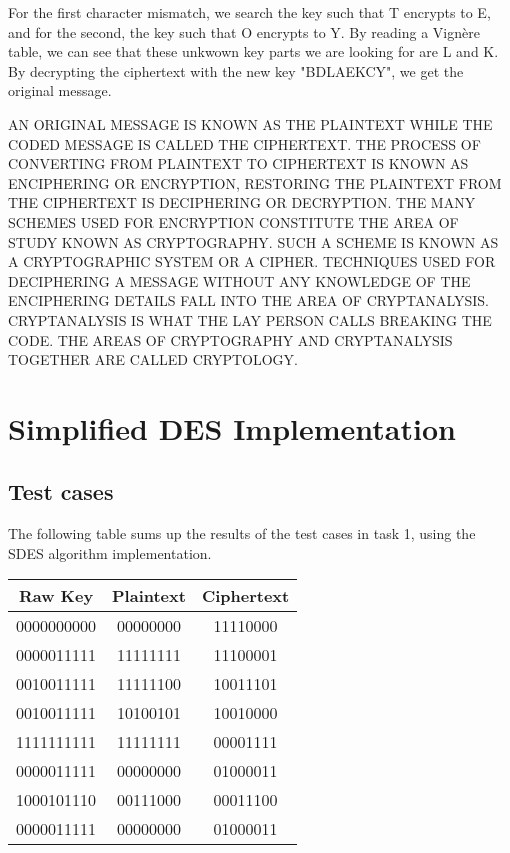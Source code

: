 \documentclass{article}
\begin{document}
For the first character mismatch, we search the key such that T encrypts to E, and for the second, the key such that O encrypts to Y. By reading a Vignère table, we can see that these unkwown key parts we are looking for are L and K.
By decrypting the ciphertext with the new key "BDLAEKCY", we get the original message.
\bigskip

\sloppy
AN ORIGINAL MESSAGE IS KNOWN AS THE PLAINTEXT WHILE THE CODED MESSAGE IS CALLED THE CIPHERTEXT. THE PROCESS OF CONVERTING FROM PLAINTEXT TO CIPHERTEXT IS KNOWN AS ENCIPHERING OR ENCRYPTION,  RESTORING THE PLAINTEXT FROM THE CIPHERTEXT IS DECIPHERING OR DECRYPTION. THE MANY SCHEMES USED FOR ENCRYPTION CONSTITUTE THE AREA OF STUDY KNOWN AS CRYPTOGRAPHY. SUCH A SCHEME IS KNOWN AS A CRYPTOGRAPHIC SYSTEM OR A CIPHER. TECHNIQUES USED FOR DECIPHERING A MESSAGE WITHOUT ANY KNOWLEDGE OF THE ENCIPHERING DETAILS FALL INTO THE AREA OF CRYPTANALYSIS. CRYPTANALYSIS IS WHAT THE LAY PERSON CALLS BREAKING THE CODE. THE AREAS OF CRYPTOGRAPHY AND CRYPTANALYSIS TOGETHER ARE CALLED CRYPTOLOGY.

\section{Simplified DES Implementation}

\subsection{Test cases}


The following table sums up the results of the test cases in task 1, using the SDES algorithm implementation.

\begin{center}
    \begin{tabular}{|c c c|}
        \hline
        \textbf{Raw Key} & \textbf{Plaintext} & \textbf{Ciphertext} \\
        \hline
        0000000000 & 00000000 & 11110000 \\
        0000011111 & 11111111 & 11100001 \\
        0010011111 & 11111100 & 10011101 \\
        0010011111 & 10100101 & 10010000 \\
        1111111111 & 11111111 & 00001111 \\
        0000011111 & 00000000 & 01000011 \\
        1000101110 & 00111000 & 00011100 \\
        0000011111 & 00000000 & 01000011 \\
        \hline
    \end{tabular}
\end{center}
\end{document}
